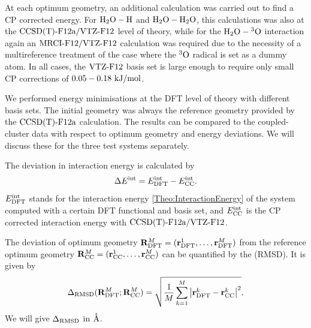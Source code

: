 \documentclass[8.5pt,twoside,twocolumn]{article}
\newcommand\eint{\enmat{E^{\te{int}}}}
\newcommand\dft{\enmat{_{\te{DFT}}}}
\newcommand\cc{\enmat{_{\te{CC}}}}
\renewcommand{\Ang}{\mathring{\te{A}}}
\renewcommand\r{\bo r}
\newcommand\kmo{\enmat{\te {kJ/mol}}}
\theoremstyle{standard}
\begin{document}
At each optimum geometry, an additional calculation was carried out to find a CP
corrected energy. For $\mbox{\ensuremath{\text H _2 \text O-\text H}}$ and $\mbox{\ensuremath{\text H _2 \text O-\text H _2 \text O}}$, this calculations was also at the $\text{CCSD(T)-F12a}/\text{VTZ-F}12$ level
of theory, while for the $\mbox{\ensuremath{\text H _2 \text O-\hspace{.2pt} ^3\text{O}}}$ interaction again an $\text{MRCI-F12}/\text{VTZ-F}12$ calculation was
required due to the necessity of a multireference treatment of the case where the
$^3\text O$ radical is set as a dummy atom. In all cases, the $\text{VTZ-F}12$ basis set is 
large enough to require only small CP corrections of $0.05 - 0.18 \ \kmo$. 

We performed energy minimisations at the DFT level of theory with different basis sets. The initial
geometry was always the reference geometry provided by the $\text{CCSD(T)-F12a}$ calculation. The results can be compared
to the coupled-cluster data with respect to optimum geometry and energy deviations. We will discuss
these for the three test systems separately.

The deviation in interaction energy is calculated by 
\newcommand\ecc{\enmat{\eint_{\te {CC}}}}
\begin{equation}
\Dl\eint=\eint\dft-\ecc.
\label{Bench:RefEnergy}
\end{equation}
$\eint\dft$ stands for the interaction energy \eqref{Theo:InteractionEnergy} of
the system computed with a certain DFT functional and basis set, and $\ecc$ is
the CP corrected interaction energy with $\text{CCSD(T)-F12a}/\text{VTZ-F}12$.

The deviation of optimum geometry \mbox{$\bo R^M\dft=(\r^1\dft,\ldots,\r^M\dft)$} from the reference optimum geometry 
\mbox{$\bo R^M\cc=(\r^1\cc,\ldots,\r^M\cc)$} can be quantified by the  (RMSD). It
is given by
\newcommand{\DRMSD}{\Dl_{\te{RMSD}}}
\begin{equation}
\Dl_{\te{RMSD}}(\bo R^M\dft;\bo R^M\cc)=\sqrt{\frac 1 M \sum_{k=1}^M \abs{\r^k\dft-\r^k\cc}^2}.
\label{Bench:RMSD}
\end{equation}
We will give $\DRMSD$ in $\Ang$.   
\end{document}
